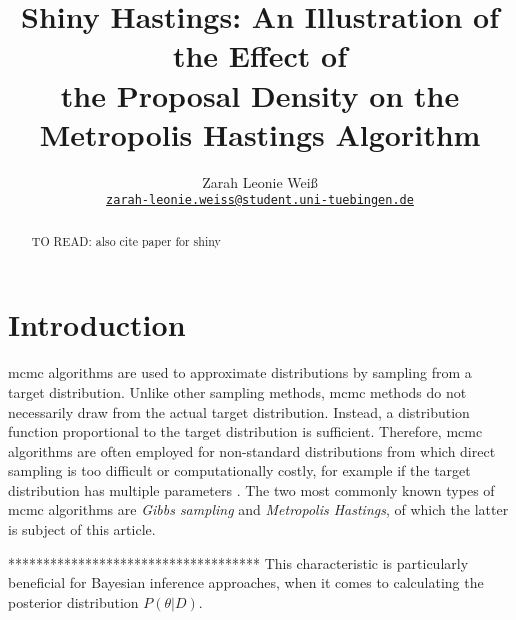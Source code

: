 \documentclass[11pt]{article}
\title{Shiny Hastings: An Illustration of the Effect of \\the Proposal Density on the Metropolis Hastings Algorithm}
\author{Zarah Leonie Weiß \\
  {\tt \href{mailto:zarah-leonie.weiss@student.uni-tuebingen.de}{zarah-leonie.weiss@student.uni-tuebingen.de}} \\
  }
\date{}
\begin{document}
\maketitle
\begin{abstract}
TO READ: 
also cite paper for shiny
\end{abstract}

\section{Introduction}\label{sec:intro}


\gls{mcmc} algorithms are used to approximate distributions by sampling from a target distribution. Unlike other sampling methods, \gls{mcmc} methods do not necessarily draw from the actual target distribution. Instead, a distribution function proportional to the target distribution is sufficient. Therefore, \gls{mcmc} algorithms are often employed for non-standard distributions from which direct sampling is too difficult or computationally costly, for example if the target distribution has multiple parameters \parencite{???}. 
The two most commonly known types of \gls{mcmc} algorithms are \textit{Gibbs sampling} and \textit{Metropolis Hastings}, of which the latter is subject of this article.

************************************
This characteristic is particularly beneficial for Bayesian inference approaches, when it comes to calculating the posterior distribution $P(\theta|D)$. 

\end{document}
